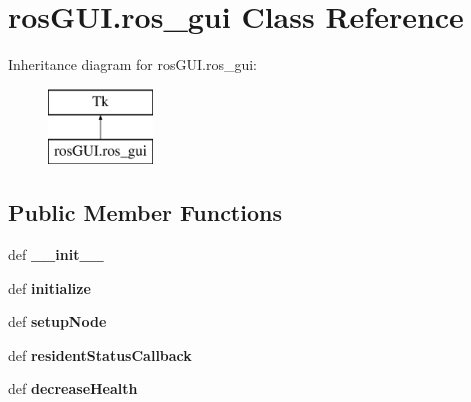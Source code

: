 \hypertarget{classrosGUI_1_1ros__gui}{\section{ros\-G\-U\-I.\-ros\-\_\-gui Class Reference}
\label{classrosGUI_1_1ros__gui}
}
Inheritance diagram for ros\-G\-U\-I.\-ros\-\_\-gui\-:\begin{figure}[H]
\begin{center}
\leavevmode
\includegraphics[height=2.000000cm]{classrosGUI_1_1ros__gui}
\end{center}
\end{figure}
\subsection*{Public Member Functions}
\begin{DoxyCompactItemize}
\item 
\hypertarget{classrosGUI_1_1ros__gui_ac3440f21602583cba395cdb3c6972199}{def {\bfseries \-\_\-\-\_\-init\-\_\-\-\_\-}}\label{classrosGUI_1_1ros__gui_ac3440f21602583cba395cdb3c6972199}

\item 
\hypertarget{classrosGUI_1_1ros__gui_a0ea7365b3064802a5439a8bece3f7c18}{def {\bfseries initialize}}\label{classrosGUI_1_1ros__gui_a0ea7365b3064802a5439a8bece3f7c18}

\item 
\hypertarget{classrosGUI_1_1ros__gui_af657d49b93f446b0a9b43a6f7161ab4c}{def {\bfseries setup\-Node}}\label{classrosGUI_1_1ros__gui_af657d49b93f446b0a9b43a6f7161ab4c}

\item 
\hypertarget{classrosGUI_1_1ros__gui_a5e1f672c68ef5d8bafe18b6e8f3e6edf}{def {\bfseries resident\-Status\-Callback}}\label{classrosGUI_1_1ros__gui_a5e1f672c68ef5d8bafe18b6e8f3e6edf}

\item 
\hypertarget{classrosGUI_1_1ros__gui_ac388ca6fe6783f826844da976d513442}{def {\bfseries decrease\-Health}}\label{classrosGUI_1_1ros__gui_ac388ca6fe6783f826844da976d513442}

\end{DoxyCompactItemize}
